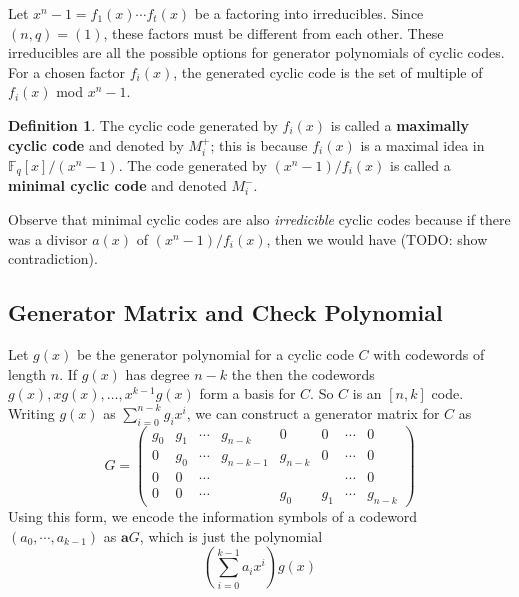 \documentclass{article}
\newcommand{\F}{\mathbb{F}}
\renewcommand{\=}{\equiv}
\newcommand{\ass}[1]{\left( #1 \right)}
\renewcommand{\v}{\mathbf}
\theoremstyle{plain}
\theoremstyle{definition}
\newtheorem{defn}{Definition}[subsection]
\newcommand{\TODO}[1]{(TODO: #1)}
\begin{document}
Let $x^n - 1 = f_1(x) \cdots f_t(x)$ be a factoring into irreducibles.
Since $(n, q) = (1)$, these factors must be different from each other.
These irreducibles are all the possible options for generator polynomials of cyclic codes.
For a chosen factor $f_i(x)$, the generated cyclic code is the set of multiple of $f_i(x)$ mod $x^n - 1$.

\begin{defn}
  \label{def:cyclic-generator}
  The cyclic code generated by $f_i(x)$ is called a \textbf{maximally cyclic code} and denoted by $M_i^+$; this is because $f_i(x)$ is a maximal idea in $\F_q[x]/(x^n-1)$.
  The code generated by $(x^n-1)/f_i(x)$ is called a \textbf{minimal cyclic code} and denoted $M_i^-$.
\end{defn}

Observe that minimal cyclic codes are also \textit{irredicible} cyclic codes because if there was a divisor $a(x)$ of $(x^n-1)/f_i(x)$, then we would have \TODO{show contradiction}.

\subsection{Generator Matrix and Check Polynomial}
\label{sec:gen-mat-and-check-poly}

Let $g(x)$ be the generator polynomial for a cyclic code $C$ with codewords of length $n$.
If $g(x)$ has degree $n-k$ the then the codewords $g(x), xg(x), \dots, x^{k-1}g(x)$ form a basis for $C$.
So $C$ is an $[n,k]$ code.
Writing $g(x)$ as $\sum_{i=0}^{n-k} g_i x^i$, we can construct a generator matrix for $C$ as
$$ G = \begin{pmatrix}
  g_0 & g_1 & \cdots & g_{n-k}   & 0       & 0   & \cdots & 0 \\
  0   & g_0 & \cdots & g_{n-k-1} & g_{n-k} & 0   & \cdots & 0 \\
  0   & 0   & \cdots &           &         &     & \cdots & 0 \\
  0   & 0   & \cdots &           & g_0     & g_1 & \cdots & g_{n-k}
\end{pmatrix} $$
Using this form, we encode the information symbols of a codeword $(a_0, \cdots, a_{k-1})$ as $\v a G$, which is just the polynomial
$$ \ass{ \sum_{i=0}^{k-1} a_i x^i } g(x) $$
\end{document}
